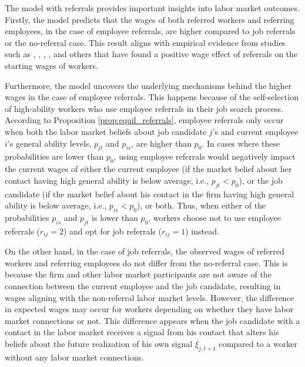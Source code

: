 \documentclass[12pt]{article}
\begin{document}

The model with referrals provides important insights into labor market outcomes. Firstly, the model predicts that the wages of both referred workers and referring employees, in the case of employee referrals, are higher compared to job referrals or the no-referral case. This result aligns with empirical evidence from studies such as \cite{corcoran1980most}, \cite{simon1992matchmaker}, \cite{loury2006some}, \cite{dustmann2016referral}, and others that have found a positive wage effect of referrals on the starting wages of workers.

Furthermore, the model uncovers the underlying mechanisms behind the higher wages in the case of employee referrals. This happens because of the self-selection of high-ability workers who use employee referrals in their job search process. According to Proposition \ref{prop:equil_referrals}, employee referrals only occur when both the labor market beliefs about job candidate $j$'s and current employee $i$'s general ability levels, $p_{jt}$ and $p_{is}$, are higher than $p_0$. In cases where these probabilities are lower than $p_0$, using employee referrals would negatively impact the current wages of either the current employee (if the market belief about her contact having high general ability is below average, i.e., $p_{jt} < p_0$), or the job candidate (if the market belief about his contact in the firm having high general ability is below average, i.e., $p_{is} < p_0$), or both. Thus, when either of the probabilities $p_{is}$ and $p_{jt}$ is lower than $p_0$, workers choose not to use employee referrals ($r_{ij}=2$) and opt for job referrals ($r_{ij}=1$) instead.

On the other hand, in the case of job referrals, the observed wages of referred workers and referring employees do not differ from the no-referral case. This is because the firm and other labor market participants are not aware of the connection between the current employee and the job candidate, resulting in wages aligning with the non-referral labor market levels. However, the difference in expected wages may occur for workers depending on whether they have labor market connections or not. This difference appears when the job candidate with a contact in the labor market receives a signal from his contact that alters his beliefs about the future realization of his own signal $\xi_{j,t+1}$ compared to a worker without any labor market connections.
\end{document}
